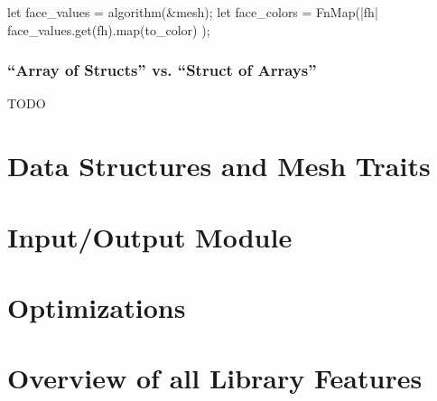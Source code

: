 \begin{center}
  \begin{minipage}{.59\textwidth}
    \begin{rustcode}
      let face_values = algorithm(&mesh);
      let face_colors = FnMap(|fh| {
          face_values.get(fh).map(to_color)
      });
    \end{rustcode}
  \end{minipage}
\end{center}


\subsubsection*{\enquote{Array of Structs} vs. \enquote{Struct of Arrays}}

TODO

\section{Data Structures and Mesh Traits}


\section{Input/Output Module}


\section{Optimizations}


\section{Overview of all Library Features}
